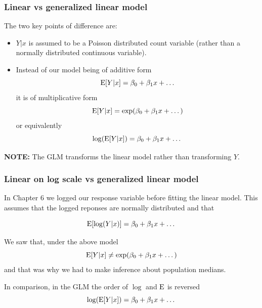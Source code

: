 \documentclass{beamer}\usepackage[]{graphicx}\usepackage[]{xcolor}
\begin{document}
\begin{frame}
\frametitle{Linear vs generalized linear model}
The two key points of difference are:
\medskip

\begin{itemize}
\item $Y|x$ is assumed to be a Poisson distributed count variable (rather than a
normally distributed continuous variable).

\item
Instead of our model being of additive form
\[ \operatorname{E}[Y|x] = {\beta_0 +  \beta_1 x + \dots} \]
it is of multiplicative form
\[ \operatorname{E}[Y|x] = \exp(\beta_0 +  \beta_1 x + \dots) \]
or equivalently
\[ \log (\operatorname{E}[Y|x]) = \beta_0 +  \beta_1 x + \dots \]
\end{itemize}
\bigskip

{\bf NOTE:} The GLM transforms the linear model rather than transforming $Y$.
\end{frame}



\begin{frame}
\frametitle{Linear on log scale vs generalized linear model}
In Chapter 6 we logged our response variable before fitting the linear model.
This assumes that the logged reponses are normally distributed and that

\[ \operatorname{E}[\log(Y|x)] = \beta_0 +  \beta_1 x + \dots \]

We saw that, under the above model 
\[ \operatorname{E}[Y|x] \ne \exp(\beta_0 +  \beta_1 x + \dots)\]
and that was why we had to make inference about population medians.
\bigskip \bigskip

In comparison, in the GLM the order of $\log$ and $\operatorname{E}$ is reversed
\[ \log (\operatorname{E}[Y|x]) = \beta_0 +  \beta_1 x + \dots \]

\end{frame}

\end{document}
